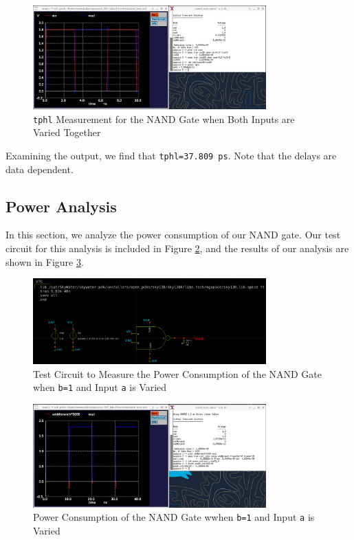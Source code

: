 \documentclass[fleqn]{article}
\begin{document}
	\begin{figure}[H]
		\centerline{\includegraphics[width=0.8\textwidth]{nand_delay_sweep_va_vb.png}}
		\caption{\texttt{tphl} Measurement for the NAND Gate when Both Inputs are Varied Together}
		\label{fig::nand_delay_sweep_va_vb}
	\end{figure}
	
	Examining the output, we find that \texttt{tphl=37.809 ps}. Note that the delays are data dependent.
	
	\subsection{Power Analysis}
	
	In this section, we analyze the power consumption of our NAND gate. Our test circuit for this analysis is included in Figure \ref{fig::nand_power_test_sweep_va}, and the results of our analysis are shown in Figure \ref{fig::nand_power_sweep_va}.
	
	\begin{figure}[H]
		\centerline{\includegraphics[width=0.8\textwidth]{nand_power_test_sweep_va.png}}
		\caption{Test Circuit to Measure the Power Consumption of the NAND Gate when \texttt{b=1} and Input \texttt{a} is Varied}
		\label{fig::nand_power_test_sweep_va}
	\end{figure}
	
	\begin{figure}[H]
		\centerline{\includegraphics[width=0.8\textwidth]{nand_power_sweep_va.png}}
		\caption{Power Consumption of the NAND Gate wwhen \texttt{b=1} and Input \texttt{a} is Varied}
		\label{fig::nand_power_sweep_va}
	\end{figure}
	
\end{document}
